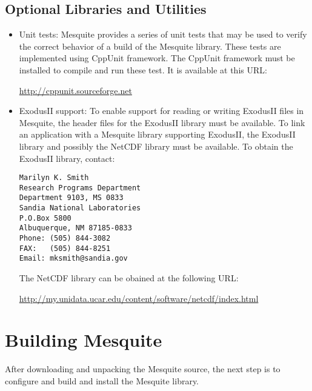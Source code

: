 \subsection{Optional Libraries and Utilities}
\label{sec:depends}
\begin{itemize}
\item Unit tests:  Mesquite provides a series of unit tests that may be used
to verify the correct behavior of a build of the Mesquite library.  These tests
are implemented using CppUnit framework.  The CppUnit framework must be installed
to compile and run these test.  It is available at this URL:
\begin{center}
\url{http://cppunit.sourceforge.net}
\end{center}
\item ExodusII support:  To enable support for reading or writing ExodusII files in Mesquite, the header files for the ExodusII library must be available.  To link an application with a Mesquite library supporting ExodusII, the ExodusII library and possibly the NetCDF library must be available.  To obtain the ExodusII library, contact:
\begin{verbatim}
Marilyn K. Smith
Research Programs Department
Department 9103, MS 0833
Sandia National Laboratories
P.O.Box 5800
Albuquerque, NM 87185-0833
Phone: (505) 844-3082
FAX:   (505) 844-8251
Email: mksmith@sandia.gov
\end{verbatim}
The NetCDF library can be obained at the following URL:
\begin{center}
\begin{small}\url{http://my.unidata.ucar.edu/content/software/netcdf/index.html}\end{small}
\end{center}
\end{itemize}


\section{Building Mesquite}
\label{sec:compiling}
After downloading and unpacking the Mesquite source, the next step is to 
configure and build and install the Mesquite library.  
